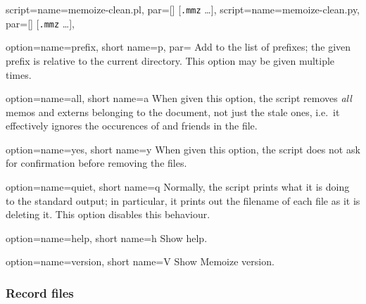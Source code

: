 \documentclass[a4paper,11pt]{article}
\begin{document}
\begin{doc}{
    script={name=memoize-clean.pl, par=[] [\texttt{.mmz} \dots]},
    script={name=memoize-clean.py, par=[] [\texttt{.mmz} \dots]},
  }
  \begin{doc}{
      option={name=prefix, short name=p, par=}
    }
    Add  to the list of prefixes; the given prefix is
    relative to the current directory.  This option may be given multiple
    times.
  \end{doc}
  \begin{doc}{
      option={name=all, short name=a}
    }
    When given this option, the script removes \emph{all} memos and externs
    belonging to the document, not just the stale ones, i.e.\ it effectively
    ignores the occurences of  and friends in the \dmmz
    file.
  \end{doc}
  \begin{doc}{
      option={name=yes, short name=y}
    }
    When given this option, the script does not ask for confirmation before
    removing the files.
  \end{doc}
  \begin{doc}{
      option={name=quiet, short name=q}
    }
    Normally, the script prints what it is doing to the standard output; in
    particular, it prints out the filename of each file as it is deleting it.
    This option disables this behaviour.
  \end{doc}
  \begin{doc}{
      option={name=help, short name=h}
    }
    Show help.
  \end{doc}
  \begin{doc}{
      option={name=version, short name=V}
    }
    Show Memoize version.
  \end{doc}
\end{doc}

\subsubsection{Record files}
\label{sec:ref:record-files}
\end{document}
